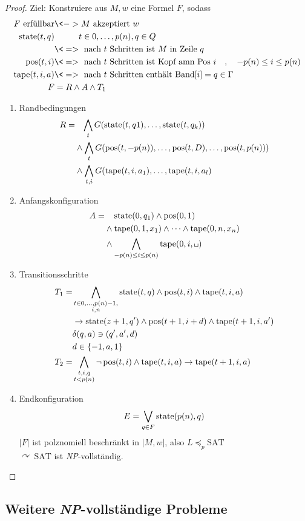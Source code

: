 \begin{proof}
	Ziel: Konstruiere aus $M,w$ eine Formel $F$, sodass
	\begin{align*}
		F\text{ erfüllbar} &\<-> M\text{ akzeptiert }w\\
		\state(t,q) &\phantom{\<->} t\in 0,\dots,p(n), q\in Q\\
		&\<=>\text{ nach $t$ Schritten ist $M$ in Zeile }q\\
		\pos(t,i) &\<=>\text{ nach $t$ Schritten ist Kopf amn Pos } i\quad,\quad -p(n)\leq i\leq p(n)\\
		\tape(t,i,a) &\<=>\text{ nach $t$ Schritten enthält Band}[i] = q\in\Gamma\\
		F &= R \land A\land T_1
	\end{align*}
	\begin{enumerate}
	\item Randbedingungen
		\begin{align*}
			R =&\phantom{\land}\, \bigwedge_t G(\operatorname{state}(t,q1),\dots,\operatorname{state}(t,q_k))\\
			& \land \bigwedge_t G(\operatorname{pos}(t,-p(n)),\dots,\operatorname{pos}(t,D),\dots,\operatorname{pos}(t,p(n)))\\
			& \land \bigwedge_{t,i} G(\operatorname{tape}(t,i,a_1),\dots,\operatorname{tape}(t,i,a_l)
		\end{align*}
	\item Anfangskonfiguration
		\begin{align*}
			A =&\phantom{\land}\; \state(0,q_1)\land \pos(0,1)\\
			&\land\tape(0,1,x_1)\land\dots\land\tape(0,n,x_n)\\
			&\land\bigwedge_{-p(n)\leq i\leq p(n)} \tape(0,i,\blank)
		\end{align*}
	\item Transitionsschritte
	\begin{align*}
		T_1 =& \bigwedge_{\substack{t\in 0,\dots,p(n)-1,\\i,n}} \state(t,q)\land \pos(t,i) \land \tape(t,i,a)\\
		&\-> \state(z+1,q')\land \pos(t+1,i+d) \land \tape(t+1,i,a')\\
		&\delta(q,a)\ni(q',a',d)\\
		&d\in\{-1,a,1\}\\
		T_2 =& \bigwedge_{\substack{t,i,q\\t<p(n)}} \neg \pos(t,i)\land \tape(t,i,a) \-> \tape(t+1,i,a)
	\end{align*}
	\item Endkonfiguration
		\[ E = \bigvee_{q\in F} \operatorname{state}(p(n),q) \]
		$|F|$ ist polznomiell beschränkt in $|M,w|$, also $L\preceq_p \mathrm{SAT}$\\
		$\curvearrowright\ \mathrm{SAT}$ ist \textit{NP}-vollständig.
	\end{enumerate}
\end{proof}

\subsection{Weitere \textit{NP}-vollständige Probleme}


